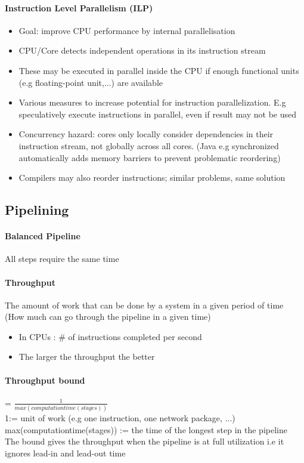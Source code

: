 \documentclass[8pt]{extreport}
\begin{document}
\paragraph{Instruction Level Parallelism (ILP) } 
\begin{itemize}
\item Goal: improve CPU performance by internal parallelisation
\item CPU/Core detects independent operations in its instruction stream
\item These may be executed in parallel inside the CPU if enough functional units (e.g floating-point unit,...) are available
\item Various measures to increase potential for instruction parallelization. E.g speculatively execute instructions in parallel, even if result may not be used
\item Concurrency hazard: cores only locally consider dependencies in their instruction stream, not globally across all cores. (Java e.g synchronized automatically adds memory barriers to prevent problematic reordering)
\item Compilers may also reorder instructions; similar problems, same solution
\end{itemize}
\subsection{Pipelining}
\paragraph{Balanced Pipeline} All steps require the same time
\paragraph{Throughput} The amount of work that can be done by a system in a given period of time (How much can go through the pipeline in a given time)
\begin{itemize}
\item In CPUs : $\#$ of instructions completed per second
\item The larger the throughput the better
\end{itemize}
\paragraph{Throughput bound} = $\frac{1}{max(computationtime(stages))}$\\
1:= unit of work (e.g one instruction, one network package, ...)\\
max(computationtime(stages)) := the time of the longest step in the pipeline\\
The bound gives the throughput when the pipeline is at full utilization i.e it ignores lead-in and lead-out time 
\end{document}
